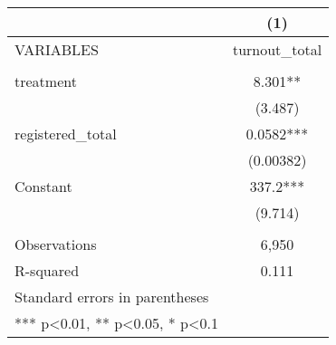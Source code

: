 \documentclass[12pt]{article} %
\begin{document}
\begin{table}[]
\begin{tabular}{|l|c|}
\hline
                                                               & (1)                   \\ \hline
VARIABLES                                                      & turnout\_total        \\ \hline
                                                               &                       \\ \hline
treatment                                                      & 8.301**               \\ \hline
                                                               & (3.487)               \\ \hline
registered\_total                                              & 0.0582***             \\ \hline
                                                               & (0.00382)             \\ \hline
Constant                                                       & 337.2***              \\ \hline
                                                               & (9.714)               \\ \hline
                                                               &                       \\ \hline
Observations                                                   & 6,950                 \\ \hline
R-squared                                                      & 0.111                 \\ \hline
Standard   errors in parentheses                               & \multicolumn{1}{l|}{} \\ \hline
***   p\textless{}0.01, ** p\textless{}0.05, * p\textless{}0.1 & \multicolumn{1}{l|}{} \\ \hline
\end{tabular}
\end{table}
\end{document}
